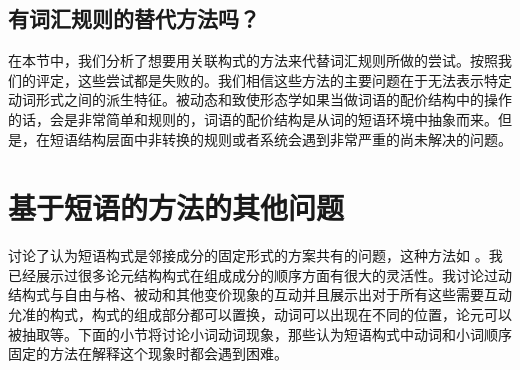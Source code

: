 \begin{exe}
\begin{xlist}[iv.]
\begin{exe}
\begin{xlist}[iv.]
\subsection{有词汇规则的替代方法吗？}
 
在本节中，我们分析了想要用关联构式的方法来代替词汇规则所做的尝试。按照我们的评定，这些尝试都是失败的。我们相信这些方法的主要问题在于无法表示特定动词形式之间的派生特征。被动态和致使形态学如果当做词语的配价结构中的操作的话，会是非常简单和规则的，词语的配价结构是从词的短语环境中抽象而来。但是，在短语结构层面中非转换的规则或者系统会遇到非常严重的尚未解决的问题。

\section{基于短语的方法的其他问题}

 \citet{Mueller2006d}讨论了认为短语构式是邻接成分的固定形式的方案共有的问题，这种方法如 \citet{GJ2004a}。我已经展示过很多论元结构构式在组成成分的顺序方面有很大的灵活性。我讨论过动结构式与自由与格、被动和其他变价现象的互动并且展示出对于所有这些需要互动允准的构式，构式的组成部分都可以置换，动词可以出现在不同的位置，论元可以被抽取等。下面的小节将讨论小词动词现象，那些认为短语构式中动词和小词顺序固定的方法在解释这个现象时都会遇到困难。


\end{xlist}
\end{exe}
\end{xlist}
\end{exe}
